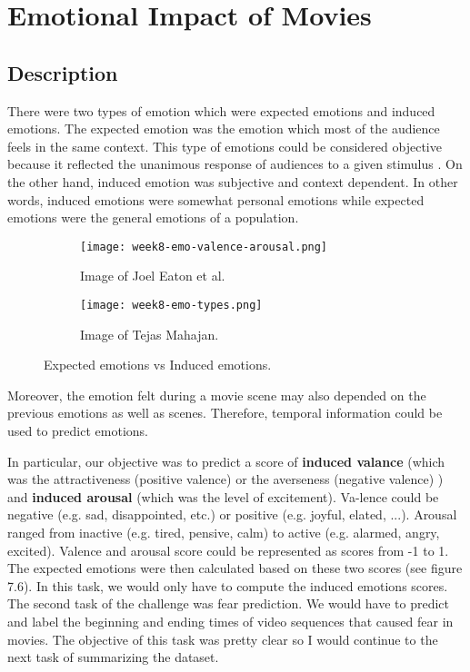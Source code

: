 {\section{Emotional Impact of Movies\cite{emotion18}}
\subsection{Description}
There were two types of emotion which were expected emotions and induced emotions. The expected emotion was the emotion which most of the audience feels in  the same context. This type of emotions could be considered objective because it reflected the unanimous response of audiences to a given stimulus \cite{emotion}. On the other hand, induced emotion was subjective and context dependent. In other words, induced emotions were somewhat personal emotions while expected emotions were the general emotions of a population.

\begin{figure}[!ht]
\centering
\begin{subfigure}{0.5\textwidth}
  \centering
  \texttt{[image: week8-emo-valence-arousal.png]}
  \caption{Image of Joel Eaton et al.}
\end{subfigure}%
\begin{subfigure}{0.5\textwidth}
  \centering
  \texttt{[image: week8-emo-types.png]}
  \caption{Image of Tejas Mahajan.}
\end{subfigure}
\caption{Expected emotions vs Induced emotions.}
\end{figure}

Moreover, the emotion felt during a movie scene may also depended on the previous emotions as well as scenes. Therefore, temporal information could be used to predict emotions.

In particular, our objective was to predict a score of \textbf{induced valance} (which was the attractiveness (positive valence) or the averseness (negative valence) \cite{valence}) and \textbf{induced arousal} (which was the level of excitement). Va-lence could be negative (e.g. sad, disappointed, etc.) or positive (e.g. joyful, elated, ...). Arousal ranged from inactive (e.g. tired, pensive, calm) to active (e.g. alarmed, angry, excited). Valence and arousal score could be represented as scores from -1 to 1. The expected emotions were then calculated based on these two scores (see figure 7.6). In this task, we would only have to compute the induced emotions scores. The second task of the challenge was fear prediction. We would have to predict and label the beginning and ending times of video sequences that caused fear in movies. The objective of this task was pretty clear so I would continue to the next task of summarizing the dataset.

}
